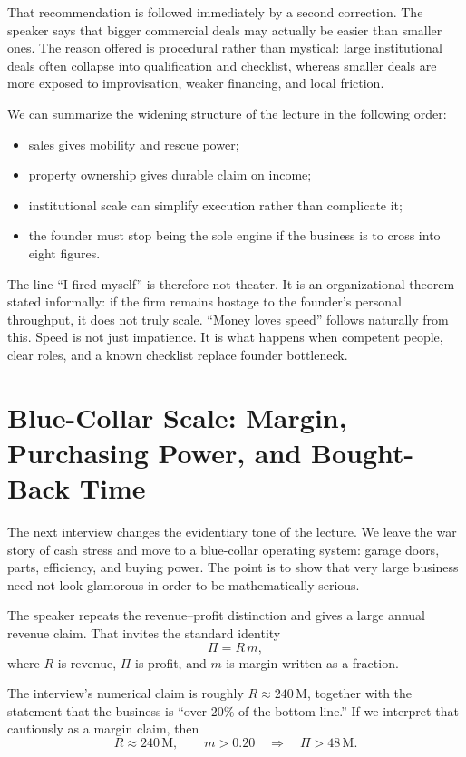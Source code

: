 That recommendation is followed immediately by a second correction. The speaker says that bigger commercial deals may actually be easier than smaller ones. The reason offered is procedural rather than mystical: large institutional deals often collapse into qualification and checklist, whereas smaller deals are more exposed to improvisation, weaker financing, and local friction.

We can summarize the widening structure of the lecture in the following order:
\begin{itemize}
\item sales gives mobility and rescue power;
\item property ownership gives durable claim on income;
\item institutional scale can simplify execution rather than complicate it;
\item the founder must stop being the sole engine if the business is to cross into eight figures.
\end{itemize}

The line ``I fired myself'' is therefore not theater. It is an organizational theorem stated informally: if the firm remains hostage to the founder's personal throughput, it does not truly scale. ``Money loves speed'' follows naturally from this. Speed is not just impatience. It is what happens when competent people, clear roles, and a known checklist replace founder bottleneck.

\section{Blue-Collar Scale: Margin, Purchasing Power, and Bought-Back Time}

The next interview changes the evidentiary tone of the lecture. We leave the war story of cash stress and move to a blue-collar operating system: garage doors, parts, efficiency, and buying power. The point is to show that very large business need not look glamorous in order to be mathematically serious.

The speaker repeats the revenue--profit distinction and gives a large annual revenue claim. That invites the standard identity
\begin{equation}
\Pi = R\,m,
\end{equation}
where \(R\) is revenue, \(\Pi\) is profit, and \(m\) is margin written as a fraction.

The interview's numerical claim is roughly \(R \approx 240\,\text{M}\), together with the statement that the business is ``over \(20\%\) of the bottom line.'' If we interpret that cautiously as a margin claim, then
\begin{equation}
R \approx 240\,\text{M},\qquad m > 0.20
\quad \Longrightarrow \quad
\Pi > 48\,\text{M}.
\end{equation}

